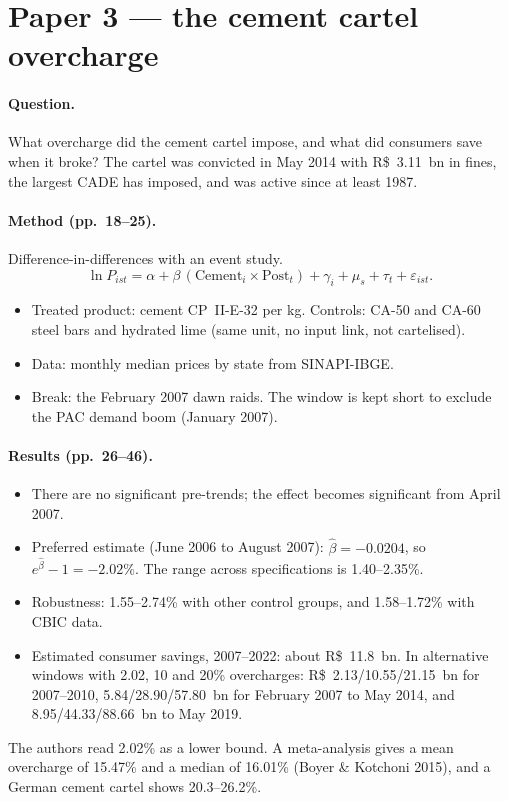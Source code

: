 \documentclass[11pt,a4paper]{article}
\begin{document}
\section{Paper 3 --- the cement cartel overcharge}

\paragraph{Question.} What overcharge did the cement cartel impose, and what did consumers save
when it broke? The cartel was convicted in May 2014 with R\$~3.11~bn in fines, the largest CADE
has imposed, and was active since at least 1987.

\paragraph{Method (pp.\ 18--25).} Difference-in-differences with an event study.
\[
\ln P_{ist} = \alpha + \beta\,(\text{Cement}_i\times\text{Post}_t) + \gamma_i + \mu_s + \tau_t + \varepsilon_{ist}.
\]
\begin{itemize}
\item Treated product: cement CP~II-E-32 per kg. Controls: CA-50 and CA-60 steel bars and hydrated
lime (same unit, no input link, not cartelised).
\item Data: monthly median prices by state from SINAPI-IBGE.
\item Break: the February 2007 dawn raids. The window is kept short to exclude the PAC demand boom
(January 2007).
\end{itemize}

\paragraph{Results (pp.\ 26--46).}
\begin{itemize}
\item There are no significant pre-trends; the effect becomes significant from April 2007.
\item Preferred estimate (June 2006 to August 2007): $\hat\beta=-0.0204$, so
$e^{\hat\beta}-1=-2.02\%$. The range across specifications is 1.40--2.35\%.
\item Robustness: 1.55--2.74\% with other control groups, and 1.58--1.72\% with CBIC data.
\item Estimated consumer savings, 2007--2022: about R\$~11.8~bn. In alternative windows with 2.02,
10 and 20\% overcharges: R\$~2.13/10.55/21.15~bn for 2007--2010, 5.84/28.90/57.80~bn for
February 2007 to May 2014, and 8.95/44.33/88.66~bn to May 2019.
\end{itemize}
The authors read 2.02\% as a lower bound. A meta-analysis gives a mean overcharge of 15.47\% and
a median of 16.01\% (Boyer \& Kotchoni 2015), and a German cement cartel shows 20.3--26.2\%.
\end{document}
